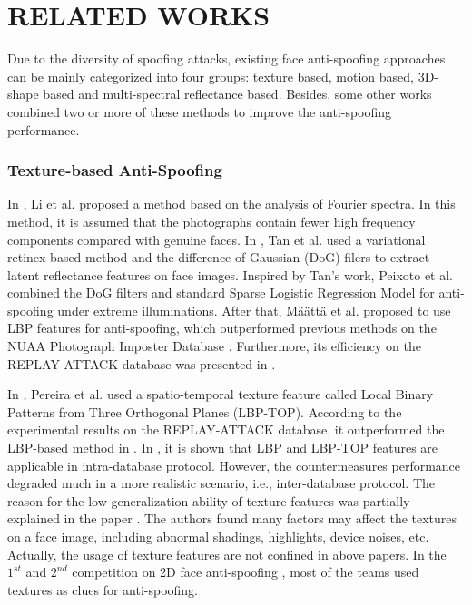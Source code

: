 \documentclass[letterpaper, 10 pt, conference]{ieeeconf}
\begin{document}
\section{RELATED WORKS}

Due to the diversity of spoofing attacks, existing face anti-spoofing approaches can be mainly categorized into four groups: texture based, motion based, 3D-shape based and multi-spectral reflectance based. Besides, some other works combined two or more of these methods to improve the anti-spoofing performance.

\subsubsection{Texture-based Anti-Spoofing}

In \cite{Face_Anti_Spoofing_JianweiLi_Fourier_2004}, Li et al. proposed a method based on the analysis of Fourier spectra. In this method, it is assumed that the photographs contain fewer high frequency components compared with genuine faces. In \cite{Face_Anti_Spoofing_XiaoyangTan_ECCV_2010}, Tan et al. used a variational retinex-based method and the difference-of-Gaussian (DoG) filers to extract latent reflectance features on face images. Inspired by Tan's work, Peixoto et al. \cite{DBLP:conf/icip/PeixotoMR11} combined the DoG filters and standard Sparse Logistic Regression Model for anti-spoofing under extreme illuminations. After that, M\"{a}\"{a}tt\"{a} et al. \cite{DBLP:conf/IJCB/Maatta} proposed to use LBP features for anti-spoofing, which outperformed previous methods on the NUAA Photograph Imposter Database \cite{DBLP:conf/eccv/TanLLJ10}. Furthermore, its efficiency on the REPLAY-ATTACK database was presented in \cite{Face_Anti_Spoofing_DataBase_Chingovska_2012}.

In \cite{de2013lbp}, Pereira et al. used a spatio-temporal texture feature called Local Binary Patterns from Three Orthogonal Planes (LBP-TOP). According to the experimental results on the REPLAY-ATTACK database, it outperformed the LBP-based method in \cite{DBLP:conf/IJCB/Maatta}. In \cite{Face_Anti_Spoofing_Pereira_2013}, it is shown that LBP and LBP-TOP features are applicable in intra-database protocol. However, the countermeasures performance degraded much in a more realistic scenario, i.e., inter-database protocol. The reason for the low generalization ability of texture features was partially explained in the paper \cite{Face_Anti_Spoofing_JianweiYang_2013}. The authors found many factors may affect the textures on a face image, including abnormal shadings, highlights, device noises, etc. Actually, the usage of texture features are not confined in above papers. In the $1^{st}$ and $2^{nd}$ competition on 2D face anti-spoofing \cite{Face_Anti_Spoofing_Competition_2011} \cite{Face_Anti_Spoofing_Competition_2013}, most of the teams used textures as clues for anti-spoofing.
\end{document}
